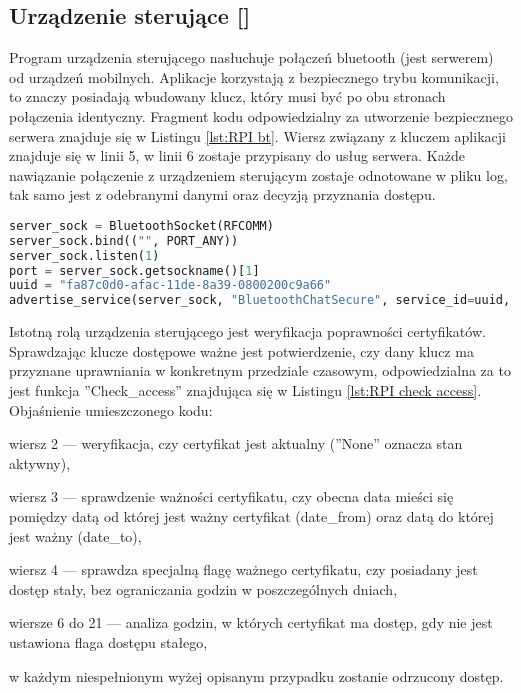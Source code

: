 \subsection{Urządzenie sterujące [\StudentA]}
Program urządzenia sterującego nasłuchuje połączeń bluetooth (jest serwerem) od urządzeń mobilnych. Aplikacje korzystają z bezpiecznego trybu komunikacji, to znaczy posiadają wbudowany klucz, który musi być po obu stronach połączenia identyczny. Fragment kodu odpowiedzialny za utworzenie bezpiecznego serwera znajduje się w Listingu \ref{lst:RPI bt}. Wiersz związany z kluczem aplikacji znajduje się w linii 5, w linii 6 zostaje przypisany do usług serwera. Każde nawiązanie połączenie z urządzeniem sterującym zostaje odnotowane w pliku log, tak samo jest z odebranymi danymi oraz decyzją przyznania dostępu. 
{\footnotesize 
\begin{lstlisting}[caption={Tworzenie serwera bluetooth}, label={lst:RPI bt}, language=Python]
server_sock = BluetoothSocket(RFCOMM)
server_sock.bind(("", PORT_ANY))
server_sock.listen(1)
port = server_sock.getsockname()[1]
uuid = "fa87c0d0-afac-11de-8a39-0800200c9a66"
advertise_service(server_sock, "BluetoothChatSecure", service_id=uuid, service_classes=[uuid, SERIAL_PORT_CLASS], profiles=[SERIAL_PORT_PROFILE])
\end{lstlisting}}
Istotną rolą urządzenia sterującego jest weryfikacja poprawności certyfikatów. Sprawdzając klucze dostępowe ważne jest potwierdzenie, czy dany klucz ma przyznane uprawniania w konkretnym przedziale czasowym, odpowiedzialna za to jest funkcja ''Check\_access'' znajdująca się w Listingu \ref{lst:RPI check access}. Objaśnienie umieszczonego kodu:
\begin{itemize*}
	\item wiersz 2 --- weryfikacja, czy certyfikat jest aktualny (''None'' oznacza stan aktywny),
	\item wiersz 3 --- sprawdzenie ważności certyfikatu, czy obecna data mieści się pomiędzy datą od której jest ważny certyfikat (date\_from) oraz datą do której jest ważny (date\_to),
	\item  wiersz 4 --- sprawdza specjalną flagę ważnego certyfikatu, czy posiadany jest dostęp stały, bez ograniczania godzin w poszczególnych dniach,
	\item wiersze 6 do 21 --- analiza godzin, w których certyfikat ma dostęp, gdy nie jest ustawiona flaga dostępu stałego,
	\item w każdym niespełnionym wyżej opisanym przypadku zostanie odrzucony dostęp.
\end{itemize*}

